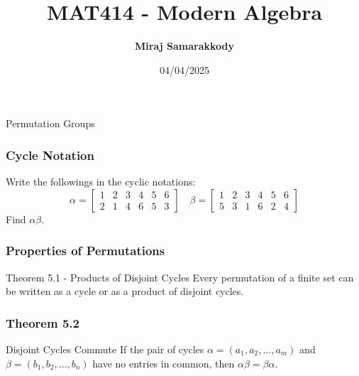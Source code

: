 \documentclass{beamer}
\title{MAT414 - Modern Algebra}
\author{\textbf{Miraj Samarakkody}}
\institute{Tougaloo College}
\date{04/04/2025}
\begin{document}
\begin{frame}
    \titlepage
\end{frame}


\begin{frame}
    \frametitle{}

    \Huge{Permutation Groups}

\end{frame}

\begin{frame}
    \frametitle{Cycle Notation}

    Write the followings in the cyclic notations:
    \[
    \alpha = \begin{bmatrix}
        1 & 2 & 3& 4 & 5 & 6\\
        2& 1& 4 & 6 & 5 & 3
    \end{bmatrix}\quad \beta =  \begin{bmatrix}
        1 & 2 & 3& 4 & 5 & 6\\
        5& 3& 1 & 6 & 2 & 4
    \end{bmatrix}
    \] \pause
    Find \(\alpha \beta\). 

\end{frame}

\begin{frame}
    \frametitle{Properties of Permutations}

    \begin{block}{Theorem 5.1 - Products of Disjoint Cycles}
        Every permutation of a finite set can be written as a cycle or as a product of disjoint cycles. 
    \end{block}

\end{frame}

\begin{frame}
    \frametitle{Theorem 5.2}

    \begin{block}{Disjoint Cycles Commute}
        If the pair of cycles \(\alpha = (a_1,a_2, \dots, a_m)\) and \(\beta =(b_1, b_2, \dots, b_n)\) have no entries in common, then \(\alpha \beta = \beta \alpha\).
    \end{block}

\end{frame}
\end{document}
